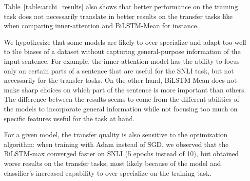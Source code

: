 \documentclass[11pt,letterpaper]{article}
\begin{document}
Table~\ref{table:archi_results} also shows that better performance on the training task does not necessarily translate in better results on the transfer tasks like when comparing inner-attention and BiLSTM-Mean for instance.

We hypothesize that some models are likely to over-specialize and adapt too well to the biases of a dataset without capturing general-purpose information of the input sentence. For example, the inner-attention model has the ability to focus only on certain parts of a sentence that are useful for the SNLI task, but not necessarily for the transfer tasks. On the other hand, BiLSTM-Mean does not make sharp choices on which part of the sentence is more important than others. The difference between the results seems to come from the different abilities of the models to incorporate general information while not focusing too much on specific features useful for the task at hand.

For a given model, the transfer quality is also sensitive to the optimization algorithm: when training with Adam instead of SGD, we observed that the BiLSTM-max converged faster on SNLI (5 epochs instead of 10), but obtained worse results on the transfer tasks, most likely because of the model and classifier's increased capability to over-specialize on the training task.
\end{document}
